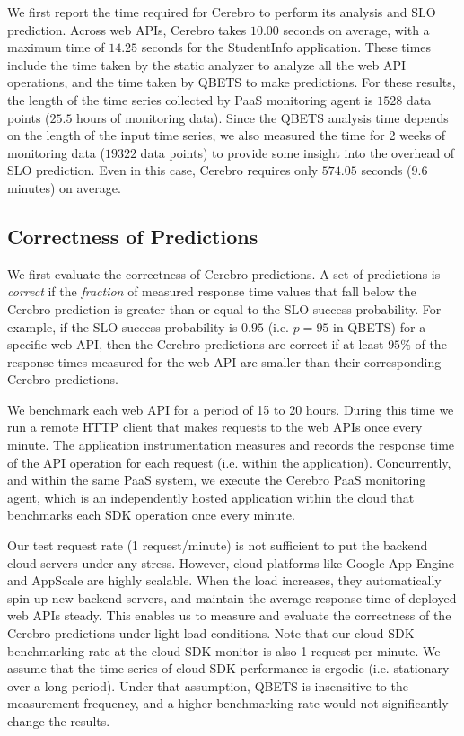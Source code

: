 We first report the time required for Cerebro to perform its analysis and SLO prediction.
Across web APIs, Cerebro takes $10.00$ seconds on average, with a 
maximum time of $14.25$ seconds for the StudentInfo application.
These times include the time taken
by the static analyzer to analyze all the web API operations,
and the time taken by QBETS to make predictions. For these results, the length of 
the time series collected by PaaS monitoring agent is $1528$ data points ($25.5$ hours of monitoring data). 
Since the QBETS analysis time depends on the length of the input time series, 
we also measured the time for 2 weeks of monitoring data ($19322$ data points) to provide
some insight into the overhead of SLO prediction.  Even in this case, Cerebro
requires only $574.05$ seconds ($9.6$ minutes) on average.

\subsection{Correctness of Predictions}
\label{sec:correctness}

We first evaluate the correctness of Cerebro predictions.  A set of
predictions is \textit{correct} if the \textit{fraction} of measured 
response time values that fall below the Cerebro prediction is greater than 
or equal to the SLO success probability. 
For example, if the SLO success probability is $0.95$ (i.e. $p=95$ in QBETS) for
a specific web API, then the Cerebro predictions are correct if at least
$95\%$ of the response times measured for the web API are smaller than their
corresponding Cerebro predictions. 

We benchmark each web API for a period of 15 to 20 hours.  During this time we
run a remote HTTP client that makes requests to the web APIs once every
minute. The application instrumentation measures and records the response
time of the API operation for each request (i.e. within the application).
Concurrently, and within the same PaaS system, we execute the Cerebro
PaaS monitoring agent, which is an independently hosted application within the
cloud that benchmarks each SDK operation once every minute.

Our test request rate (1 request/minute) is not sufficient to put the backend cloud servers
under any stress. However, cloud platforms like Google App Engine and
AppScale are highly scalable. When the load increases, they automatically spin up new backend servers,
and maintain the average response time of deployed web APIs steady. This 
enables us to measure and evaluate the correctness of the Cerebro predictions under
light load conditions. Note that our cloud SDK benchmarking rate at the cloud SDK monitor
is also 1 request per minute. We assume that the time series of cloud SDK performance is ergodic
(i.e. stationary over a long period). Under that assumption, QBETS is insensitive to the measurement
frequency, and a higher benchmarking rate would not significantly change the results.

